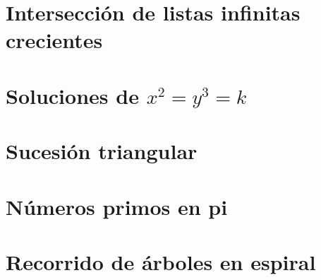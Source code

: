 \documentclass[a4paper,12pt,twoside]{book}
\begin{document}
\chapter{Intersección de listas infinitas crecientes}
\label{190121}

\chapter{Soluciones de \(x^2 = y^3 = k\)}
\label{190122}

\chapter{Sucesión triangular}
\label{190123}

\chapter{Números primos en pi}
\label{190124}

\chapter{Recorrido de árboles en espiral}
\label{190125}

\end{document}
